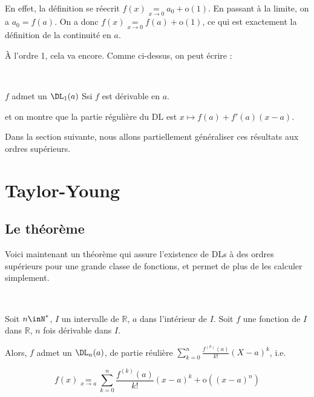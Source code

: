 \documentclass[12pt]{article}
\begin{document}
En effet, la définition se réecrit $f(x)\underset{x\rightarrow 0}{=}a_0+\text{o}(1)$. En passant à la
limite, on a $a_0=f(a)$. On a donc $f(x)\underset{x\rightarrow
  0}{=}f(a)+\text{o}(1)$, ce qui est exactement
la définition de la continuité en $a$.

\medskip

À l'ordre 1, cela va encore. Comme ci-dessus, on peut écrire :

\begin{Prop}~

$f$ admet un $\DL_1(a)$ Ssi $f$ est dérivable en $a$.

\end{Prop}

et on montre que la partie régulière du DL est $x\mapsto f(a)+f'(a)(x-a)$.


\medskip

Dans la section suivante, nous allons partiellement généraliser ces
résultats aux ordres supérieurs. 

\section{Taylor-Young}

\subsection{Le théorème}

Voici maintenant un théorème qui assure l'existence de DLs à des ordres
supérieurs pour une grande classe de fonctions, et permet de plus de les
calculer simplement.

\begin{Theo}~ 

\label{TaylorYoung}

Soit $n \inN^*$, $I$ un intervalle de $\mathbb{R}$, $a$ dans l'intérieur de
$I$. Soit $f$ une fonction de $I$ dans $\mathbb{R}$, $n$ fois dérivable
dans $I$.

Alors, $f$ admet un $\DL_n(a)$, de partie réulière
$\sum_{k=0}^n\frac{f^{(k)}(a)}{k!}(X-a)^k$, i.e.

$$f(x)\underset{x\rightarrow a}{=}\sum_{k=0}^n\frac{f^{(k)}(a)}{k!}(x-a)^k+\text{o}((x-a)^n)$$

\end{Theo}
\end{document}
